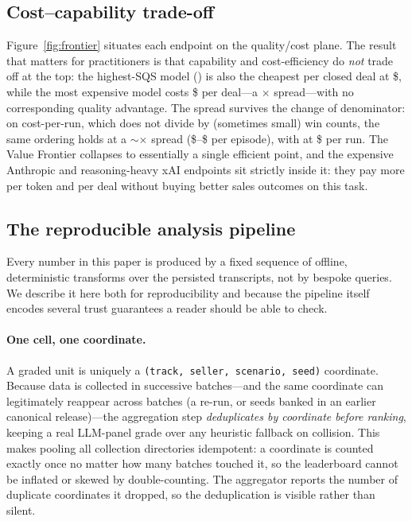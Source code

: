 \subsection{Cost--capability trade-off}
Figure~\ref{fig:frontier} situates each endpoint on the quality/cost plane.
The result that matters for practitioners is that capability and cost-efficiency do
\emph{not} trade off at the top: the highest-SQS model (\resBestModel{}) is also the
cheapest per closed deal at \$\resCostPerDealMin{}, while the most expensive model
costs \$\resCostPerDealMax{} per deal---a \resCostPerDealSpread$\times$
spread---with no
corresponding quality advantage. The spread survives the change of denominator:
on cost-per-run, which does not divide by (sometimes small) win counts, the same
ordering holds at a $\sim$\resCostPerRunSpread$\times$ spread
(\$\resCostPerRunMin{}--\$\resCostPerRunMax{} per episode), with
\resBestModel{} at \$\resFrontierBestCostPerRun{} per run. The Value Frontier collapses to essentially a
single efficient point, and the expensive Anthropic and reasoning-heavy xAI
endpoints sit strictly inside it: they pay more per token and per deal without
buying better sales outcomes on this task.

\subsection{The reproducible analysis pipeline}
\label{sec:pipeline}
Every number in this paper is produced by a fixed sequence of offline,
deterministic transforms over the persisted transcripts, not by bespoke queries.
We describe it here both for reproducibility and because the pipeline itself
encodes several trust guarantees a reader should be able to check.

\paragraph{One cell, one coordinate.} A graded unit is uniquely a
\texttt{(track, seller, scenario, seed)} coordinate. Because data is collected in
successive batches---and the same coordinate can legitimately reappear across
batches (a re-run, or seeds banked in an earlier canonical release)---the
aggregation step \emph{deduplicates by coordinate before ranking}, keeping a real
LLM-panel grade over any heuristic fallback on collision. This makes pooling all
collection directories idempotent: a coordinate is counted exactly once no matter
how many batches touched it, so the leaderboard cannot be inflated or skewed by
double-counting. The aggregator reports the number of duplicate coordinates it
dropped, so the deduplication is visible rather than silent.

